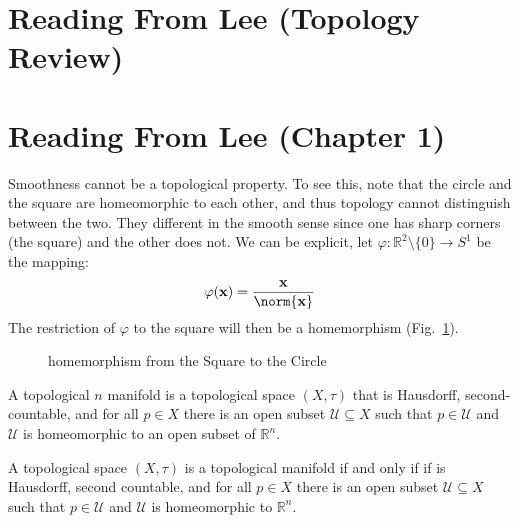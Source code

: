 \documentclass{article}                                                        %
\begin{document}
    \section{Reading From Lee (Topology Review)}
    \section{Reading From Lee (Chapter 1)}
        Smoothness cannot be a topological property. To see this, note that the
        circle and the square are homeomorphic to each other, and thus topology
        cannot distinguish between the two. They different in the smooth sense
        since one has sharp corners (the square) and the other does not. We can
        be explicit, let
        $\varphi:\mathbb{R}^{2}\setminus\{0\}\rightarrow{S}^{1}$ be the mapping:
        \begin{equation}
            \varphi(\mathbf{x})=\frac{\mathbf{x}}{\norm{\mathbf{x}}}
        \end{equation}
        The restriction of $\varphi$ to the square will then be a homemorphism
        (Fig.~\ref{fig:Homeomorphism_Square_to_Circle}).
        \begin{figure}[H]
            \centering
            \captionsetup{type=figure}
            
            \caption{homemorphism from the Square to the Circle}
            \label{fig:Homeomorphism_Square_to_Circle}
        \end{figure}
        \begin{definition}
            A topological $n$ manifold is a topological space $(X,\tau)$ that is
            Hausdorff, second-countable, and for all $p\in{X}$ there is an open
            subset $\mathcal{U}\subseteq{X}$ such that $p\in\mathcal{U}$ and
            $\mathcal{U}$ is homeomorphic to an open subset of $\mathbb{R}^{n}$.
        \end{definition}
        \begin{theorem}
            A topological space $(X,\tau)$ is a topological manifold if and only
            if if is Hausdorff, second countable, and for all $p\in{X}$ there is
            an open subset $\mathcal{U}\subseteq{X}$ such that $p\in\mathcal{U}$
            and $\mathcal{U}$ is homeomorphic to $\mathbb{R}^{n}$.
        \end{theorem}
\end{document}
